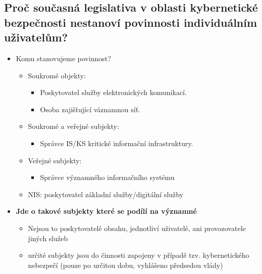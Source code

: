 \subsection{Proč současná legislativa v oblasti kybernetické bezpečnosti nestanoví povinnosti individuálním uživatelům?}
\begin{itemize}
    \item Komu stanovujeme povinnost?
          \begin{itemize}
              \item Soukromé objekty:
                    \begin{itemize}
                        \item Poskytovatel služby elektronických komunikací.
                        \item Osoba zajišťující váznamnou síť.
                    \end{itemize}
              \item Soukromé a veřejné subjekty:
                    \begin{itemize}
                        \item Správce IS/KS kritické informační infrastruktury.
                    \end{itemize}
              \item Veřejné subjekty:
                    \begin{itemize}
                        \item Správce významného informačního systému
                    \end{itemize}
              \item NIS: poskytovatel základní služby/digitální služby
          \end{itemize}
    \item \textbf{Jde o takové subjekty které se podílí na významné}
          \begin{itemize}
              \item Nejsou to poskytovatelé obsahu, jednotliví uživatelé, ani provozovatele jiných služeb
              \item určité subjekty jsou do činnosti zapojeny v případě tzv. kybernetického nebezpečí (pouze po určitou dobu, vyhlášeno předsedou vlády)
          \end{itemize}
\end{itemize}



